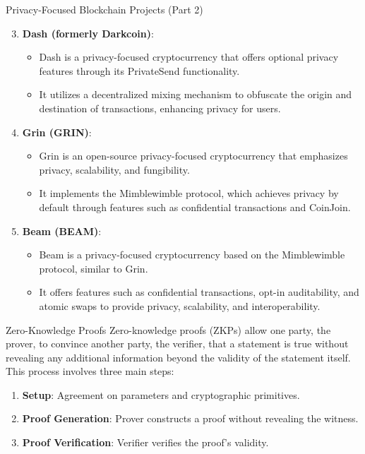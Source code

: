 \begin{withoutheadline}
\begin{frame}{Privacy-Focused Blockchain Projects (Part 2)}
    \begin{enumerate}
        \setcounter{enumi}{2}
        \item \textbf{Dash (formerly Darkcoin)}:
            \begin{itemize}
                \item Dash is a privacy-focused cryptocurrency that offers optional privacy features through its PrivateSend functionality.
                \item It utilizes a decentralized mixing mechanism to obfuscate the origin and destination of transactions, enhancing privacy for users.
            \end{itemize}
        
        \item \textbf{Grin (GRIN)}:
            \begin{itemize}
                \item Grin is an open-source privacy-focused cryptocurrency that emphasizes privacy, scalability, and fungibility.
                \item It implements the Mimblewimble protocol, which achieves privacy by default through features such as confidential transactions and CoinJoin.
            \end{itemize}
        
        \item \textbf{Beam (BEAM)}:
            \begin{itemize}
                \item Beam is a privacy-focused cryptocurrency based on the Mimblewimble protocol, similar to Grin.
                \item It offers features such as confidential transactions, opt-in auditability, and atomic swaps to provide privacy, scalability, and interoperability.
            \end{itemize}
    \end{enumerate}
\end{frame}

\begin{frame}{Zero-Knowledge Proofs}
    Zero-knowledge proofs (ZKPs) allow one party, the prover, to convince another party, the verifier, that a statement is true without revealing any additional information beyond the validity of the statement itself. This process involves three main steps:
    
    \begin{enumerate}
        \item \textbf{Setup}: Agreement on parameters and cryptographic primitives.
        \item \textbf{Proof Generation}: Prover constructs a proof without revealing the witness.
        \item \textbf{Proof Verification}: Verifier verifies the proof's validity.
    \end{enumerate}
    

\end{frame}
\end{withoutheadline}
